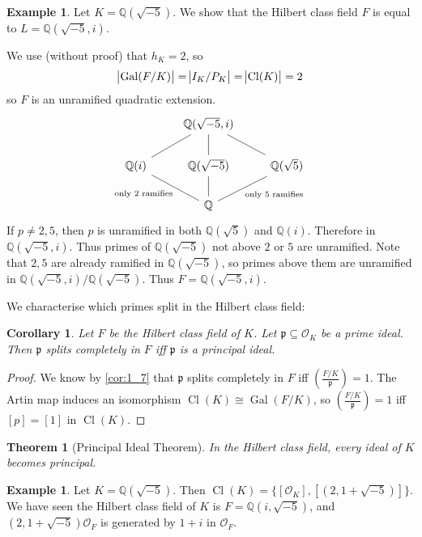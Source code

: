 \documentclass[11pt]{article}
\theoremstyle{definition}
\newtheorem{example}[definition]{Example}
\theoremstyle{plain}
\newtheorem{theorem}[definition]{Theorem}
\newtheorem{corollary}[definition]{Corollary}
\theoremstyle{remark}
\DeclareMathOperator{\Gal}{Gal}
\DeclareMathOperator{\Cl}{Cl}
\newcommand{\QQ}{\mathbb{Q}}
\newcommand{\cO}{\mathcal{O}}
\newcommand{\fp}{\mathfrak{p}}
\newcommand{\leg}[2]{\left(\frac{#1}{#2}\right)}
\begin{document}
\begin{example}\label{eg:4_7}
    Let $K = \QQ(\sqrt{-5})$. We show that the Hilbert class field $F$ is equal to $L = \QQ(\sqrt{-5}, i)$.

    We use (without proof) that $h_K = 2$, so
    \begin{equation*}
        \abs{\Gal(F/K)} = \abs{I_K/P_K} = \abs{\Cl(K)} = 2
    \end{equation*}
    so $F$ is an unramified quadratic extension.
    \begin{equation*}
    \begin{tikzcd}
        & \QQ(\sqrt{-5}, i) \arrow[dl, dash] \arrow[d, dash] \arrow[dr, dash] &\\
        \QQ(i) \arrow[dr, dash, "\text{only } 2 \text{ ramifies}"'] & \QQ(\sqrt{-5}) \arrow[d, dash] & \QQ(\sqrt{5}) \arrow[dl, dash, "\text{only } 5 \text{ ramifies}"]\\
        & \QQ
    \end{tikzcd}
    \end{equation*}
    If $p \neq 2, 5$, then $p$ is unramified in both $\QQ(\sqrt{5})$ and $\QQ(i)$. Therefore in $\QQ(\sqrt{-5}, i)$. Thus primes of $\QQ(\sqrt{-5})$ not above $2$ or $5$ are unramified. Note that $2, 5$ are already ramified in $\QQ(\sqrt{-5})$, so primes above them are unramified in $\QQ(\sqrt{-5}, i)/\QQ(\sqrt{-5})$. Thus $F = \QQ(\sqrt{-5}, i)$.
\end{example}

\noindent We characterise which primes split in the Hilbert class field:

\begin{corollary}\label{cor:4_8}
    Let $F$ be the Hilbert class field of $K$. Let $\fp \subseteq \cO_K$ be a prime ideal. Then $\fp$ splits completely in $F$ iff $\fp$ is a principal ideal.
\end{corollary}
\begin{proof}
    We know by \autoref{cor:1_7} that $\fp$ splits completely in $F$ iff $\leg{F/K}{\fp} = 1$. The Artin map induces an isomorphism $\Cl(K) \cong \Gal(F/K)$, so $\leg{F/K}{\fp} = 1$ iff $[p] = [1]$ in $\Cl(K)$.
\end{proof}

\begin{theorem}[Principal Ideal Theorem]\label{thm:4_9}
    In the Hilbert class field, every ideal of $K$ becomes principal.
\end{theorem}

\begin{example}\label{eg:4_10}
    Let $K = \QQ(\sqrt{-5})$. Then $\Cl(K) = \{[\cO_K], [(2, 1+\sqrt{-5})]\}$. We have seen the Hilbert class field of $K$ is $F = \QQ(i, \sqrt{-5})$, and $(2, 1+\sqrt{-5}) \cO_F$ is generated by $1+i$ in $\cO_F$.
\end{example}
\end{document}
